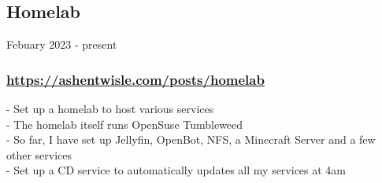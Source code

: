 \subsection{Homelab} Febuary 2023 - present \\
\subsubsection{\href{https://ashentwisle.com/posts/homelab-go-brrr}{https://ashentwisle.com/posts/homelab}}
-\:  Set up a homelab to host various services \\
-\:  The homelab itself runs OpenSuse Tumbleweed \\
-\:  So far, I have set up Jellyfin, OpenBot, NFS, a Minecraft Server and a few other services \\
-\:  Set up a CD service to automatically updates all my services at 4am \\



